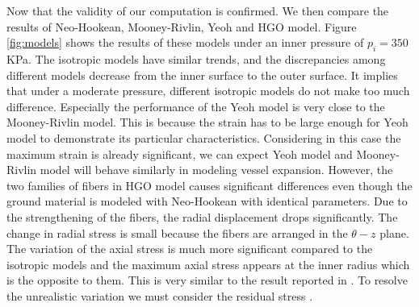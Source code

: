 Now that the validity of our computation is confirmed. We then compare the results of Neo-Hookean, Mooney-Rivlin, Yeoh and HGO model. Figure \ref{fig:models} shows the results of these models under an inner pressure of $p_i = 350$ KPa. The isotropic models have similar trends, and the discrepancies among different models decrease from the inner surface to the outer surface. It implies that under a moderate pressure, different isotropic models do not make too much difference. Especially the performance of the Yeoh model is very close to the Mooney-Rivlin model. This is because the strain has to be large enough for Yeoh model to demonstrate its particular characteristics. Considering in this case the maximum strain is already significant, we can expect Yeoh model and Mooney-Rivlin model will behave similarly in modeling vessel expansion. However, the two families of fibers in HGO model causes significant differences even though the ground material is modeled with Neo-Hookean with identical parameters. Due to the strengthening of the fibers, the radial displacement drops significantly. The change in radial stress is small because the fibers are arranged in the $\theta-z$ plane. The variation of the axial stress is much more significant compared to the isotropic models and the maximum axial stress appears at the inner radius which is the opposite to them. This is very similar to the result reported in \cite{Fung}. To resolve the unrealistic variation we must consider the residual stress \cite{Fung2}.

